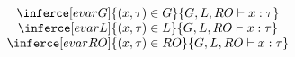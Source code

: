\[
\begin{array}{c}
\inferce[evarG]
{ (x, \tau) \in G}
{G, L, RO \vdash x : \tau}\\
\inferce[evarL]
{ (x, \tau) \in L}
{G, L, RO \vdash x : \tau}\\
\inferce[evarRO]
{ (x, \tau) \in RO}
{G, L, RO \vdash x : \tau}
\end{array}
\]
